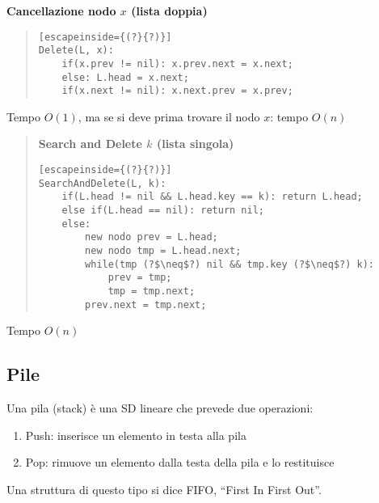 \documentclass[a4paper,10pt]{article}
\theoremstyle{definition}
\begin{document}
\begin{multicols}{2}
\textbf{Cancellazione nodo $x$ (lista doppia)}
\begin{quote}
\begin{lstlisting}[escapeinside={(?}{?)}]
Delete(L, x):
    if(x.prev != nil): x.prev.next = x.next;
    else: L.head = x.next;
    if(x.next != nil): x.next.prev = x.prev;
\end{lstlisting}
\end{quote}
Tempo $O(1)$, ma se si deve prima trovare il nodo $x$: tempo $O(n)$
\bigskip
\bigskip
\bigskip
\bigskip
\bigskip



\begin{quote}
\textbf{Search and Delete $k$ (lista singola)}
\begin{lstlisting}[escapeinside={(?}{?)}]
SearchAndDelete(L, k):
    if(L.head != nil && L.head.key == k): return L.head;
    else if(L.head == nil): return nil;
    else:
        new nodo prev = L.head;
        new nodo tmp = L.head.next;
        while(tmp (?$\neq$?) nil && tmp.key (?$\neq$?) k):
            prev = tmp;
            tmp = tmp.next;
        prev.next = tmp.next;
\end{lstlisting}
\end{quote}
Tempo $O(n)$\smallskip
\end{multicols}


\subsection{Pile}
Una pila (stack) è una SD lineare che prevede due operazioni: 
\begin{enumerate}
 \item Push: inserisce un elemento in testa alla pila
 \item Pop: rimuove un elemento dalla testa della pila e lo restituisce
\end{enumerate}
Una struttura di questo tipo si dice FIFO, ``First In First Out''.
\end{document}
